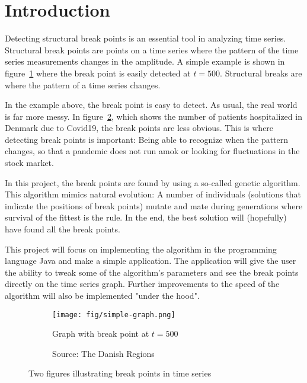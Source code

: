 
\clearpage
\section{Introduction} \label{sec:introduction}

Detecting structural break points is an essential tool in analyzing time series.
Structural break points are points on a time series where the pattern of the
time series measurements changes in the amplitude. A simple example is shown in
figure~\ref{fig:simple-graph} where the break point is easily detected at $t =
500$. Structural breaks are where the pattern of a time series changes. 

In the example above, the break point is easy to detect. As usual, the
real world is far more messy. In figure~\ref{fig:covid19-dk-en},
which shows the number of patients hospitalized in Denmark due to Covid19, the
break points are less obvious. This is where detecting break points is
important: Being able to recognize when the pattern changes, so that a pandemic
does not run amok or looking for fluctuations in the stock market. 

In this project, the break points are found by using a so-called genetic
algorithm. This algorithm mimics natural evolution: A number of individuals
(solutions that indicate the positions of break points) mutate and mate during
generations where survival of the fittest is the rule. In the end, the best
solution will (hopefully) have found all the break points. 

This project will focus on implementing the algorithm in the programming
language Java and make a simple application. The application will give the user
the ability to tweak some of the algorithm's parameters and see the break points
directly on the time series graph. Further improvements to the speed of the algorithm
will also be implemented "under the hood". 

\begin{figure}[h]
    \centering
    \begin{subfigure}[b]{0.48\textwidth}
        \centering
        \texttt{[image: fig/simple-graph.png]}
        \caption{Graph with break point at $t = 500$}
        \label{fig:simple-graph}
    \end{subfigure}
    \hfill
    \begin{subfigure}[b]{0.48\textwidth}
        \centering
        \caption{Source: The Danish Regions}
        \label{fig:covid19-dk-en}
    \end{subfigure}
    \caption{Two figures illustrating break points in time series}
    \label{fig:intro-figure}
\end{figure}